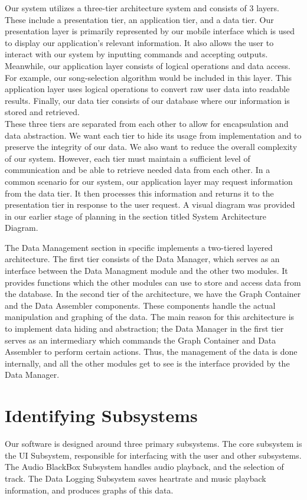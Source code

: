 \documentclass[letterpaper,english, 12pt]{scrreprt}
\begin{document}
Our system utilizes a three-tier architecture system and consists of 3 layers. These include a presentation tier, an application tier, and a data tier. Our presentation layer is primarily represented by our mobile interface which is used to display our application’s relevant information. It also allows the user to interact with our system by inputting commands and accepting outputs. Meanwhile, our application layer consists of logical operations and data access. For example, our song-selection algorithm would be included in this layer. This application layer uses logical operations to convert raw user data into readable results. Finally, our data tier consists of our database where our information is stored and retrieved. \\

These three tiers are separated from each other to allow for encapsulation and data abstraction. We want each tier to hide its usage from implementation and to preserve the integrity of our data. We also want to reduce the overall complexity of our system. However, each tier must maintain a sufficient level of communication and be able to retrieve needed data from each other. In a common scenario for our system, our application layer may request information from the data tier. It then processes this information and returns it to the presentation tier in response to the user request. A visual diagram was provided in our earlier stage of planning in the section titled System Architecture Diagram.

The Data Management section in specific implements a two-tiered layered architecture. The first tier consists of the Data Manager, which serves as an interface between the Data Managment module and the other two modules. It provides functions which the other modules can use to store and access data from the database. In the second tier of the architecture, we have the Graph Container and the Data Assembler components. These components handle the actual manipulation and graphing of the data. The main reason for this architecture is to implement data hiding and abstraction; the Data Manager in the first tier serves as an intermediary which commands the Graph Container and Data Assembler to perform certain actions. Thus, the management of the data is done internally, and all the other modules get to see is the interface provided by the Data Manager.

\section{Identifying Subsystems}
Our software is designed around three primary subsystems.
The core subsystem is the UI Subsystem, responsible for interfacing with the user and other subsystems.
The Audio BlackBox Subsystem handles audio playback, and the selection of track.
The Data Logging Subsystem saves heartrate and music playback information, and produces graphs of this data.
\\
\end{document}
